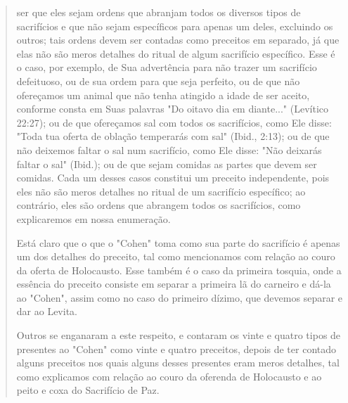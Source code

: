 \begin{quote}

ser que eles sejam ordens que abranjam todos os diversos tipos de
sacrifícios e que não sejam específicos para apenas um deles, excluindo
os outros; tais or­dens devem ser contadas como preceitos em separado,
já que elas não são me­ros detalhes do ritual de algum sacrifício
específico. Esse é o caso, por exem­plo, de Sua advertência para não
trazer um sacrifício defeituoso, ou de sua or­dem para que seja
perfeito, ou de que não ofereçamos um animal que não te­nha atingido a
idade de ser aceito, conforme consta em Suas palavras "Do oita­vo dia em
diante..." (Levítico 22:27); ou de que ofereçamos sal com todos os
sacrifícios, como Ele disse: "Toda tua oferta de oblação temperarás com
sal" (Ibid., 2:13); ou de que não deixemos faltar o sal num sacrifício,
como Ele dis­se: "Não deixarás faltar o sal" (Ibid.); ou de que sejam
comidas as partes que devem ser comidas. Cada um desses casos constitui
um preceito independen­te, pois eles não são meros detalhes no ritual de
um sacrifício específico; ao contrário, eles são ordens que abrangem
todos os sacrifícios, como explicare­mos em nossa enumeração.

Está claro que o que o "Cohen" toma como sua parte do sacrifício é
apenas um dos detalhes do preceito, tal como mencionamos com relação ao
couro da oferta de Holocausto. Esse também é o caso da primeira tosquia,
on­de a essência do preceito consiste em separar a primeira lã do
carneiro e dá-la ao "Cohen", assim como no caso do primeiro dízimo, que
devemos separar e dar ao Levita.

Outros se enganaram a este respeito, e contaram os vinte e quatro tipos
de presentes ao "Cohen" como vinte e quatro preceitos, depois de ter
contado alguns preceitos nos quais alguns desses presentes eram meros
deta­lhes, tal como explicamos com relação ao couro da oferenda de
Holocausto e ao peito e coxa do Sacrifício de Paz.


\end{quote}
